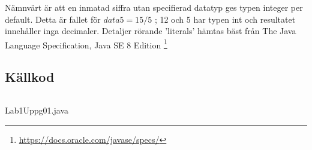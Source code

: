 
\par Nämnvärt är att en inmatad siffra utan specifierad datatyp ges typen
integer
per default. Detta är fallet för $data5 = 15 / 5$ ; 12 och 5 har typen int och
resultatet innehåller inga decimaler.  Detaljer rörande 'literals' hämtas bäst
från The Java Language Specification, Java SE 8 Edition
\footnote{\url{https://docs.oracle.com/javase/specs/}}



\subsection{Källkod}\label{subsection-1}
\begin{listing}[H]
    \inputminted[linenos=true]{java}{src/Lab1Uppg01.java}
    \caption{Lab1Uppg01.java}
    \label{Uppg1src}
\end{listing}




